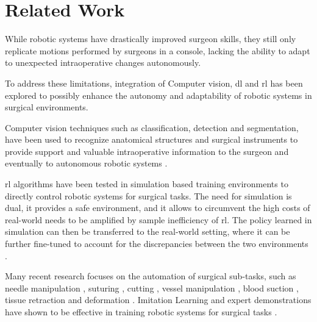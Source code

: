 

\section{Related Work}

While robotic systems have drastically improved surgeon skills, they still 
only replicate motions performed by surgeons in a console, lacking the 
ability to adapt to unexpected intraoperative changes autonomously. 

To address these limitations, integration of
Computer vision, \gls{dl} and \gls{rl} has been explored to possibly enhance the 
autonomy and adaptability of robotic systems in surgical environments.

Computer vision techniques such as classification, detection and segmentation, have been used to recognize anatomical structures
and surgical instruments to provide support and valuable intraoperative information 
to the surgeon and eventually to autonomous robotic systems 
\citep{AMPARORE2022e312, cancers16051047}. 

\gls{rl} algorithms have been tested in simulation based training 
environments to directly control robotic systems for surgical tasks. 
The need for simulation is dual, it provides a safe environment, and 
it allows to circumvent the high costs of real-world needs to be amplified 
by sample inefficiency of \gls{rl}. 
The policy learned in simulation can then be transferred to the real-world setting, 
where it can be further fine-tuned to account for the discrepancies between 
the two environments \citep{10065553}.


Many recent research focuses on the automation of surgical sub-tasks, 
such as needle manipulation \citep{10100702}, suturing \citep{9223543}, cutting \citep{Shahkoo2023},
vessel manipulation \citep{10160966}, blood suction \citep{10578312}, tissue retraction and
deformation \citep{9976185}. Imitation Learning and expert demonstrations have shown to be effective in
training robotic systems for surgical tasks \citep{kim2024surgicalrobottransformersrt}.



